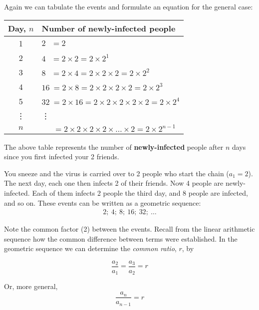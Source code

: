 Again we can tabulate the events and formulate an equation for the general case:
\begin{center}
\begin{tabular}{|c|l|}\hline
\hline \textbf{Day}, $n$ & \textbf{Number of newly-infected people} \\\hline
\hline 1 & $2 \: \: \: = 2$ \\
\hline 2 & $4 \: \: \: = 2 \times 2 = 2 \times 2^1 $ \\
\hline 3 & $8 \: \: \: = 2 \times 4 = 2 \times 2 \times 2 = 2 \times 2^2$ \\
\hline 4 & $16 \: = 2 \times 8 = 2 \times 2 \times 2 \times 2 = 2 \times 2^3$ \\
\hline 5 & $32 \: = 2 \times 16 = 2 \times 2 \times 2 \times 2 \times 2 = 2 \times 2^4$ \\
\hline \vdots & \qquad \qquad \qquad \qquad \vdots \\
\hline $n$ & $\: \: \quad = 2 \times 2 \times 2 \times 2 \times \ldots \times 2 = 2 \times 2^{n-1}$
\\
\hline\hline
\end{tabular}
\end{center}

The above table represents the number of \textbf{newly-infected} people after $n$ days since you
first infected your 2 friends. 

You sneeze and the virus is carried over to 2 people who start the chain ($a_1 = 2$).
The next day, each one then infects 2 of their friends. Now 4 people are newly-infected.
Each of them infects 2 people the third day, and 8 people are infected, and so on.
These events can be written as a geometric sequence:
\begin{eqnarray*}
2; \: 4; \: 8; \: 16; \: 32; \: \ldots
\end{eqnarray*}

Note the common factor (2) between the events. Recall from the linear arithmetic sequence how the
common difference between terms were established. In the geometric sequence we can determine the
\textit{common ratio}, $r$, by

\begin{equation}
\frac{a_2}{a_1} = \frac{a_3}{a_2} = r
\end{equation}

Or, more general,
\begin{equation}
\label{eq:mp:s:geomseq:1}
\frac{a_n}{a_{n-1}} = r
\end{equation}

